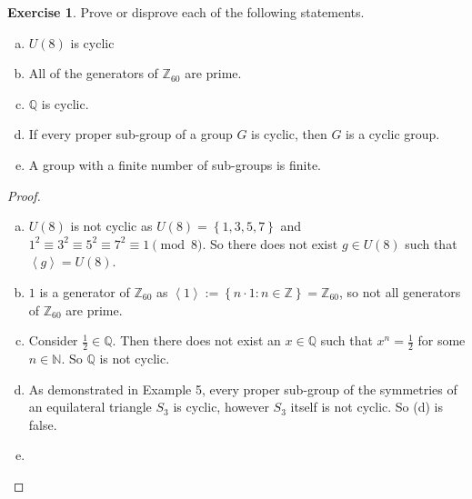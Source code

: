 \documentclass{article}
\theoremstyle{definition}
\newtheorem{theorem}{Exercise}[section]
\newcommand{\Z}{\mathbb{Z}}
\newcommand{\N}{\mathbb{N}}
\begin{document}
	\setcounter{section}{4}
	\setcounter{theorem}{0}
	\begin{theorem}
		Prove or disprove each of the following statements.
		\begin{enumerate}[(a)]
			\item $U(8)$ is cyclic 
			\item All of the generators of $\Z_{60}$ are prime. 
			\item $\mathbb{Q}$ is cyclic.
			\item If every proper sub-group of a group $G$ is cyclic, then $G$ is a cyclic group. 
			\item A group with a finite number of sub-groups is finite. 
		\end{enumerate}
	\end{theorem}
	\begin{proof}
		\begin{enumerate}[(a)]
			\item $U(8)$ is not cyclic as $U(8)=\left\{1,3,5,7\right\}$ and $1^2\equiv 3^2\equiv 5^2\equiv 7^2\equiv 1\pmod 8$. So there does not exist $g\in U(8)$ such that $\left\langle g\right\rangle=U(8)$. 
			
			\item $1$ is a generator of $\Z_{60}$ as $\left\langle1\right\rangle:=\left\{n\cdot1:n\in\Z\right\}=\Z_{60}$, so not all generators of $\Z_{60}$ are prime. 
			
			\item Consider $\frac{1}{2}\in\mathbb{Q}$. Then there does not exist an $x\in\mathbb{Q}$ such that $x^n=\frac{1}{2}$ for some $n\in\N$. So $\mathbb{Q}$ is not cyclic. 
			
			\item As demonstrated in Example 5, every proper sub-group of the symmetries of an equilateral triangle $S_3$ is cyclic, however $S_3$ itself is not cyclic. So (d) is false. 
			
			\item 
		\end{enumerate}
	\end{proof}
\end{document}
